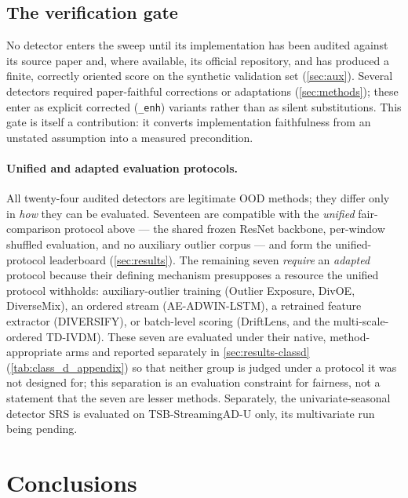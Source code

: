 \documentclass[11pt]{article}
\begin{document}
\subsection{The verification gate}
No detector enters the sweep until its implementation has been audited against its
source paper and, where available, its official repository, and has produced a
finite, correctly oriented score on the synthetic validation set (\cref{sec:aux}).
Several detectors required paper-faithful corrections or adaptations
(\cref{sec:methods}); these enter as explicit corrected (\texttt{\_enh}) variants
rather than as silent substitutions. This gate is itself a contribution: it converts implementation
faithfulness from an unstated assumption into a measured precondition.

\paragraph{Unified and adapted evaluation protocols.}
All twenty-four audited detectors are legitimate OOD methods; they differ only in
\emph{how} they can be evaluated. Seventeen are compatible with the \emph{unified}
fair-comparison protocol above --- the shared frozen ResNet backbone, per-window
shuffled evaluation, and no auxiliary outlier corpus --- and form the unified-protocol
leaderboard (\cref{sec:results}). The remaining seven \emph{require} an \emph{adapted}
protocol because their defining mechanism presupposes a resource the unified protocol
withholds: auxiliary-outlier training (Outlier Exposure, DivOE, DiverseMix), an
ordered stream (AE-ADWIN-LSTM), a retrained feature extractor (DIVERSIFY), or
batch-level scoring (DriftLens, and the multi-scale-ordered TD-IVDM). These seven are
evaluated under their native, method-appropriate arms and reported separately in
\cref{sec:results-classd} (\cref{tab:class_d_appendix}) so that neither group is
judged under a protocol it was not designed for; this separation is an evaluation
constraint for fairness, not a statement that the seven are lesser methods. Separately,
the univariate-seasonal detector SRS is evaluated on TSB-StreamingAD-U only, its
multivariate run being pending.







\section{Conclusions}\label{sec:conclusion}
\end{document}
